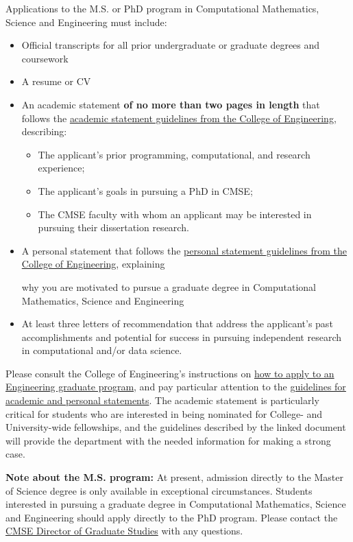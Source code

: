 Applications to the M.S. or PhD program in Computational Mathematics, Science and
Engineering must include:

\begin{itemize}
\item Official transcripts for all prior undergraduate or graduate degrees and coursework
\item A resume or CV
\item An academic statement \textbf{of no more than two pages in
    length} that follows the
  \href{http://www.egr.msu.edu/academics/graduate/academic-personal-statements-guidelines/#academic}{academic
    statement
    guidelines from the College of Engineering}, 
  describing:  

\begin{itemize}
  \item The applicant's prior programming, computational, and research experience;  
  \item The applicant's goals in pursuing a PhD in CMSE;  
  \item  The CMSE faculty with whom an applicant may be interested in
    pursuing their dissertation research.  
\end{itemize}

\item A personal statement  that follows the
  \href{http://www.egr.msu.edu/academics/graduate/academic-personal-statements-guidelines/#personal}{personal
    statement
    guidelines from the College of Engineering}, explaining

why you are motivated to pursue
  a graduate degree in Computational Mathematics, Science and Engineering

\item At least three letters of recommendation that address the
  applicant's past accomplishments and potential for success in
  pursuing independent research in computational and/or data science.

\end{itemize}

Please consult the College of Engineering's instructions on
\href{http://www.egr.msu.edu/academics/graduate/how-to-apply}{how to
apply to an Engineering graduate program}, and pay particular
attention to the
\href{http://www.egr.msu.edu/academics/graduate/academic-personal-statements-guidelines/}{guidelines
for academic and personal statements}.  The academic statement is
particularly critical for students who are interested in being
nominated for College- and University-wide fellowships, and the
guidelines described by the linked document will provide the
department with the needed information for making a strong case.

\noindent \textbf{Note about the M.S. program:} At present, admission
directly to the Master of Science degree is only available in
exceptional circumstances.  Students interested in pursuing a graduate
degree in Computational Mathematics, Science and Engineering should
apply directly to the PhD program.  Please contact the
\href{mailto:cmsegrad@msu.edu}{CMSE Director of Graduate Studies} with
any questions.
